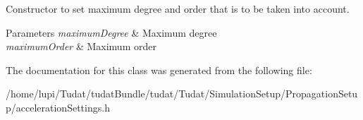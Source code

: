 Constructor to set maximum degree and order that is to be taken into account. 
\begin{DoxyParams}{Parameters}
{\em maximum\+Degree} & Maximum degree \\
\hline
{\em maximum\+Order} & Maximum order \\
\hline
\end{DoxyParams}


The documentation for this class was generated from the following file\+:\begin{DoxyCompactItemize}
\item 
/home/lupi/\+Tudat/tudat\+Bundle/tudat/\+Tudat/\+Simulation\+Setup/\+Propagation\+Setup/acceleration\+Settings.\+h\end{DoxyCompactItemize}

